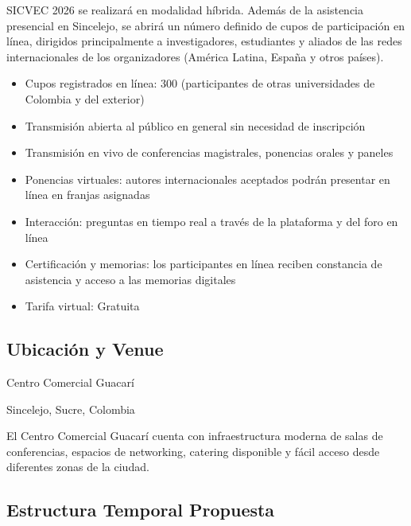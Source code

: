 \documentclass[12pt,a4paper]{article}
\begin{document}
\begin{tcolorbox}[cajainfo, title=Cupos virtuales para redes internacionales]
SICVEC 2026 se realizará en modalidad híbrida. Además de la asistencia presencial en Sincelejo, se abrirá un número definido de cupos de participación en línea, dirigidos principalmente a investigadores, estudiantes y aliados de las redes internacionales de los organizadores (América Latina, España y otros países).

\begin{itemize}[label={\textcolor{verdeosc}{\textbullet}}]
  \item Cupos registrados en línea: 300 (participantes de otras universidades de Colombia y del exterior)
  \item Transmisión abierta al público en general sin necesidad de inscripción
  \item Transmisión en vivo de conferencias magistrales, ponencias orales y paneles
  \item Ponencias virtuales: autores internacionales aceptados podrán presentar en línea en franjas asignadas
  \item Interacción: preguntas en tiempo real a través de la plataforma y del foro en línea
  \item Certificación y memorias: los participantes en línea reciben constancia de asistencia y acceso a las memorias digitales
  \item Tarifa virtual: Gratuita
\end{itemize}
\end{tcolorbox}

\subsection{Ubicación y Venue}

\begin{tcolorbox}[cajainfo, title=Lugar del Evento]
Centro Comercial Guacarí

Sincelejo, Sucre, Colombia

El Centro Comercial Guacarí cuenta con infraestructura moderna de salas de conferencias, espacios de networking, catering disponible y fácil acceso desde diferentes zonas de la ciudad.
\end{tcolorbox}

\subsection{Estructura Temporal Propuesta}
\end{document}

